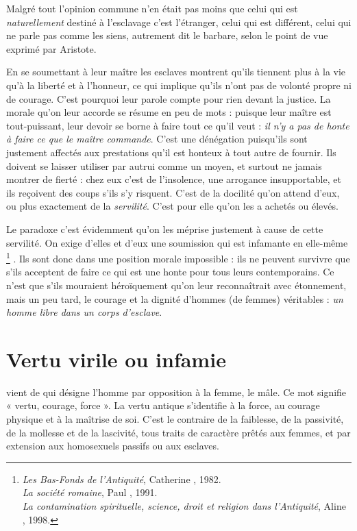 Malgré tout l'opinion commune n'en était pas moins que celui
qui est \emph{naturellement} destiné à l'esclavage c'est l'étranger, celui qui est différent,
celui qui ne parle pas comme les siens, autrement dit le barbare, selon
le point de vue exprimé par Aristote.

 En se soumettant à leur maître les esclaves montrent qu'ils tiennent plus à la vie qu'à la liberté et à l'honneur, ce qui implique qu'ils n'ont pas de volonté propre ni de courage. C'est pourquoi leur parole compte pour rien devant la justice. La morale qu'on leur accorde se résume en peu de mots : puisque leur maître est tout-puissant, leur devoir se borne à faire tout ce qu'il veut : \emph{il n'y a pas de honte à faire ce que le maître commande}. C'est une dénégation puisqu'ils sont justement affectés aux prestations qu'il est honteux à tout autre de fournir. Ils doivent se laisser utiliser par autrui comme un moyen, et surtout ne jamais montrer de fierté : chez eux c'est de l'insolence, une arrogance insupportable, et ils reçoivent des coups s'ils s'y risquent. C'est de la docilité qu'on attend d'eux, ou plus exactement de la \emph{servilité}. C'est pour elle qu'on les a achetés ou élevés. 

 Le paradoxe c'est évidemment qu'on les méprise justement à cause de cette servilité. On exige d'elles et d'eux une soumission qui est infamante en elle-même%
\footnote{\emph{Les Bas-Fonds de l'Antiquité}, Catherine , 1982.\\
\emph{La société romaine}, Paul , 1991.\\
\emph{La contamination spirituelle, science, droit et religion dans l'Antiquité}, Aline , 1998.}%
. Ils sont donc dans une position morale impossible : ils ne peuvent survivre que s'ils acceptent de faire ce qui est une honte pour tous leurs contemporains. Ce n'est que s'ils mouraient héroïquement qu'on leur reconnaîtrait avec étonnement, mais un peu tard, le courage et la dignité d'hommes (de femmes) véritables : \emph{un homme libre dans un corps d'esclave}. 


\section{Vertu virile ou infamie}

  vient de  qui désigne l'homme par opposition à la femme, le mâle. Ce mot signifie « vertu, courage, force ». La vertu antique s'identifie à la force, au courage physique et à la maîtrise de soi. C'est le contraire de la faiblesse, de la passivité, de la mollesse et de la lascivité, tous traits de caractère prêtés aux femmes, et par extension aux homosexuels passifs ou aux esclaves. 

